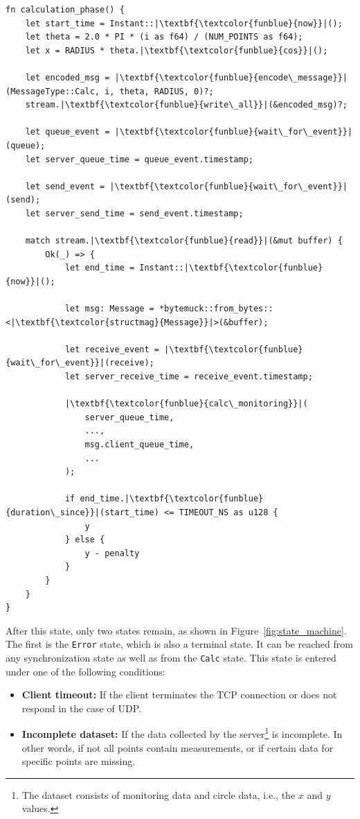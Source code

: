 \begin{listing}[ht]
    \centering
\begin{verbatim}
fn calculation_phase() {
    let start_time = Instant::|\textbf{\textcolor{funblue}{now}}|();
    let theta = 2.0 * PI * (i as f64) / (NUM_POINTS as f64);
    let x = RADIUS * theta.|\textbf{\textcolor{funblue}{cos}}|();

    let encoded_msg = |\textbf{\textcolor{funblue}{encode\_message}}|(MessageType::Calc, i, theta, RADIUS, 0)?;
    stream.|\textbf{\textcolor{funblue}{write\_all}}|(&encoded_msg)?;

    let queue_event = |\textbf{\textcolor{funblue}{wait\_for\_event}}|(queue);
    let server_queue_time = queue_event.timestamp;

    let send_event = |\textbf{\textcolor{funblue}{wait\_for\_event}}|(send);
    let server_send_time = send_event.timestamp;

    match stream.|\textbf{\textcolor{funblue}{read}}|(&mut buffer) {
        Ok(_) => {
            let end_time = Instant::|\textbf{\textcolor{funblue}{now}}|();

            let msg: Message = *bytemuck::from_bytes::<|\textbf{\textcolor{structmag}{Message}}|>(&buffer);

            let receive_event = |\textbf{\textcolor{funblue}{wait\_for\_event}}|(receive);
            let server_receive_time = receive_event.timestamp;

            |\textbf{\textcolor{funblue}{calc\_monitoring}}|(
                server_queue_time,
                ...,
                msg.client_queue_time,
                ...
            );

            if end_time.|\textbf{\textcolor{funblue}{duration\_since}}|(start_time) <= TIMEOUT_NS as u128 {
                y
            } else {
                y - penalty
            }
        }
    }
}
\end{verbatim}
\caption{Presentation of Pseudo-Code of the calculation function}
\label{lst:calc}
\end{listing}

After this state, only two states remain, as shown in Figure~\ref{fig:state_machine}.  
The first is the \texttt{Error} state, which is also a terminal state.  
It can be reached from any synchronization state as well as from the \texttt{Calc} state.  
This state is entered under one of the following conditions:  
\begin{itemize}  
    \item \textbf{Client timeout:} If the client terminates the \ac{TCP} connection or does not respond in the case of \ac{UDP}.  
    \item \textbf{Incomplete dataset:} If the data collected by the server\footnote{The dataset consists of monitoring data and circle data, i.e., the $x$ and $y$ values.} is incomplete.  
          In other words, if not all points contain measurements, or if certain data for specific points are missing.  
\end{itemize}  

